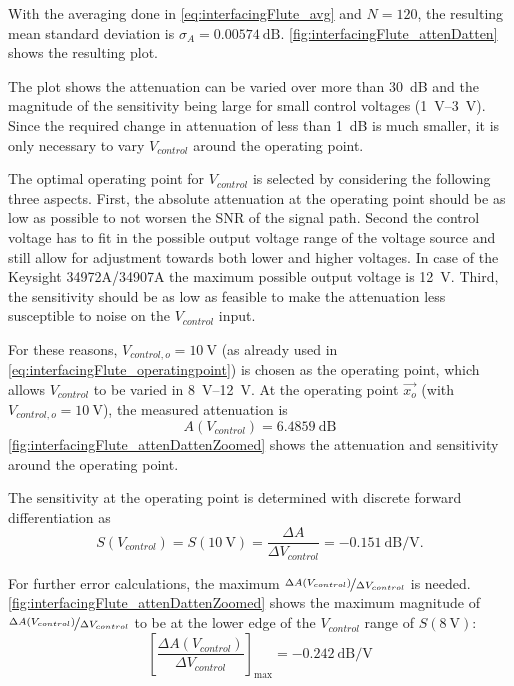 With the averaging done in \autoref{eq:interfacingFlute_avg} and $N=120$, the resulting mean standard deviation is $\sigma_A=\SI{0.00574}{\dB}$.
\autoref{fig:interfacingFlute_attenDatten} shows the resulting plot.

The plot shows the attenuation can be varied over more than \SI{30}{\dB} and the magnitude of the sensitivity being large for small control voltages (\SIrange{1}{3}{\volt}).
Since the required change in attenuation of less than \SI{1}{\dB} is much smaller, it is only necessary to vary $V_{control}$ around the operating point.

The optimal operating point for $V_{control}$ is selected by considering the following three aspects.
First, the absolute attenuation at the operating point should be as low as possible to not worsen the SNR of the signal path. Second the control voltage has to fit in the possible output voltage range of the voltage source and still allow for adjustment towards both lower and higher voltages. 
In case of the Keysight 34972A/34907A the maximum possible output voltage is \SI{12}{\volt}.
Third, the sensitivity should be as low as feasible to make the attenuation less susceptible to noise on the $V_{control}$ input.


For these reasons, $V_{control,o}=\SI{10}{\volt}$ (as already used in \autoref{eq:interfacingFlute_operatingpoint}) is chosen as the operating point, which allows $V_{control}$ to be varied in \SIrange{8}{12}{\volt}.
At the operating point $\vec{x_o}$ (with $V_{control,o}=\SI{10}{\volt}$), the measured attenuation is
\begin{equation}
A(V_{control})=\SI{6.4859}{\dB}
\end{equation}
\autoref{fig:interfacingFlute_attenDattenZoomed} shows the attenuation and sensitivity around the operating point.

The sensitivity at the operating point is determined with discrete forward differentiation as
\begin{equation}
S(V_{control})=S(\SI{10}{\volt})=\frac{\Delta A}{\Delta V_{control}} = \SI{-0.151}{\dB\per\volt}.
\end{equation}

For further error calculations, the maximum $\nicefrac{\Delta A(V_{control})}{\Delta V_{control}}$ is needed. \autoref{fig:interfacingFlute_attenDattenZoomed} shows the maximum magnitude of $\nicefrac{\Delta A(V_{control})}{\Delta V_{control}}$ to be at the lower edge of the $V_{control}$ range of $S(\SI{8}{\volt})$:
\begin{equation}
\left[\frac{\Delta A(V_{control})}{\Delta V_{control}}\right]_{\text{max}}=\SI{-0.242}{\dB\per\volt}
\end{equation}

